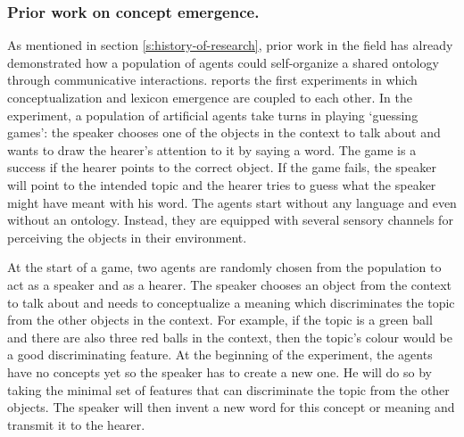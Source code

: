 \subsubsection{Prior work on concept emergence.}

As mentioned in section \ref{s:history-of-research}, prior work in the field has already demonstrated how a population of agents could self-organize a shared ontology through communicative interactions. \citet{steels97constructing} reports the first experiments in which conceptualization and lexicon emergence are coupled to each other. In the experiment, a population of artificial agents take turns in playing `guessing games': the speaker chooses one of the objects in the context to talk about and wants to draw the hearer's attention to it by saying a word. The game is a success if the hearer points to the correct object. If the game fails, the speaker will point to the intended topic and the hearer tries to guess what the speaker might have meant with his word. The agents start without any language and even without an ontology. Instead, they are equipped with several sensory channels for perceiving the objects in their environment.

At the start of a game, two agents are randomly chosen from the population to act as a speaker and as a hearer. The speaker chooses an object from the context to talk about and needs to conceptualize a meaning which discriminates the topic from the other objects in the context. For example, if the topic is a green ball and there are also three red balls in the context, then the topic's colour would be a good discriminating feature. At the beginning of the experiment, the agents have no concepts yet so the speaker has to create a new one. He will do so by taking the minimal set of features that can discriminate the topic from the other objects. The speaker will then invent a new word for this concept or meaning and transmit it to the hearer.

